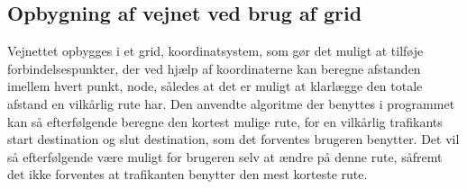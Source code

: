 \subsection{Opbygning af vejnet ved brug af grid}
Vejnettet opbygges i et grid, koordinatsystem, som gør det muligt at tilføje forbindelsespunkter, der ved hjælp af koordinaterne kan beregne afstanden imellem hvert punkt, node, således at det er muligt at klarlægge den totale afstand en vilkårlig rute har. Den anvendte algoritme der benyttes i programmet kan så efterfølgende beregne den kortest mulige rute, for en vilkårlig trafikants start destination og slut destination, som det forventes brugeren benytter. Det vil så efterfølgende være muligt for brugeren selv at ændre på denne rute, såfremt det ikke forventes at trafikanten benytter den mest korteste rute.

